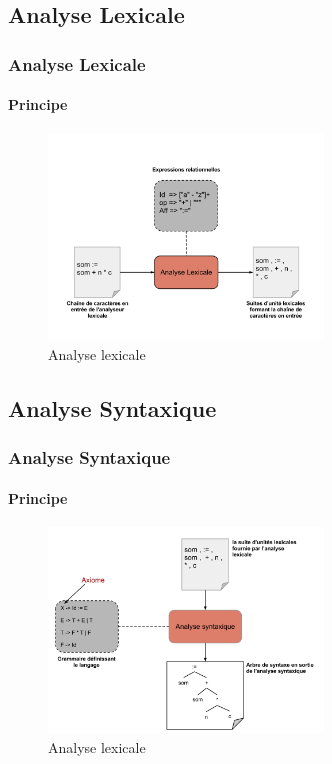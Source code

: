 \documentclass{beamer}
\begin{document}
\subsection{Analyse Lexicale}

\begin{frame}\frametitle{Analyse Lexicale}\framesubtitle{Principe}

\begin{figure}[h]
	\centering
		\includegraphics[width=0.65\textwidth]{AnalyseLexicale.png}
	\caption{Analyse lexicale}
	\label{fig:AnalyseLexicale}
\end{figure}\FloatBarrier

\end{frame}

\subsection{Analyse Syntaxique}

\begin{frame}\frametitle{Analyse Syntaxique}\framesubtitle{Principe}

\begin{figure}[h]
	\centering
		\includegraphics[width=0.65\textwidth]{AnalyseSyntaxique.png}
	\caption{Analyse lexicale}
	\label{fig:AnalyseLexicale}
\end{figure}\FloatBarrier

\end{frame}
\end{document}
